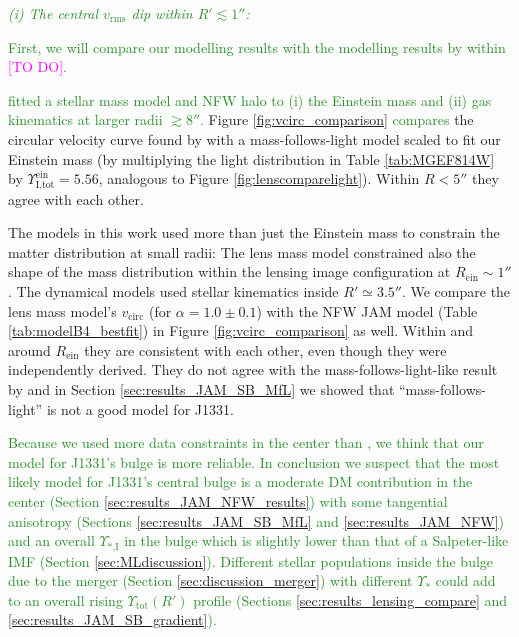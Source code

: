 \documentclass[useAMS,usenatbib]{mnras}
\newcommand{\Wilma}[1]{\textcolor{Magenta}{#1}}
\newcommand{\NEW}[1]{\textcolor{ForestGreen}{#1}}
\newcommand{\OLD}[1]{}
\begin{document}
\NEW{\emph{(i) The central $v_\text{rms}$ dip within $R'\lesssim1''$:}}

\NEW{First, we will compare our modelling results with the modelling results by \citet{SWELLSV} within \Wilma{[TO DO]}.}

\NEW{\citet{SWELLSV} fitted a stellar mass model and NFW halo to (i) the Einstein mass and (ii) gas kinematics at larger radii $\gtrsim8''$. } \OLD{In }Figure \ref{fig:vcirc_comparison} \OLD{we compare}\NEW{compares} the circular velocity curve found by \citet{SWELLSV} with a mass-follows-light model scaled to fit our Einstein mass (by multiplying the light distribution in Table \ref{tab:MGEF814W} by $\Upsilon_\text{I,tot}^\text{ein} = 5.56$, analogous to Figure \ref{fig:lenscomparelight}). Within $R < 5''$ they agree with each other. 

The models in this work used more than just the Einstein mass to constrain the matter distribution at small radii: The lens mass model constrained also the shape of the mass distribution within the lensing image configuration at $R_\text{ein} \sim 1''$. The dynamical models used stellar kinematics inside $R' \simeq 3.5''$. We compare the lens mass model's $v_\text{circ}$ (for $\alpha=1.0\pm 0.1$) with the NFW JAM model (Table \ref{tab:modelB4_bestfit}) in Figure \ref{fig:vcirc_comparison} as well. Within and around $R_\text{ein}$ they are consistent with each other, even though they were independently derived. They do not agree with the mass-follows-light-like result by \citet{SWELLSV} and in Section \ref{sec:results_JAM_SB_MfL} we showed that ``mass-follows-light'' is not a good model for J1331.

\NEW{Because we used more data constraints in the center than \citet{SWELLSV}, we think that our model for J1331's bulge is more reliable. In conclusion we suspect that the most likely model for J1331's central bulge is a moderate DM contribution in the center (Section \ref{sec:results_JAM_NFW_results}) with some tangential anisotropy (Sections \ref{sec:results_JAM_SB_MfL} and \ref{sec:results_JAM_NFW}) and an overall $\Upsilon_\text{*,I}$ in the bulge which is slightly lower than that of a Salpeter-like IMF (Section \ref{sec:MLdiscussion}). Different stellar populations inside the bulge due to the merger (Section \ref{sec:discussion_merger}) with different $\Upsilon_{*}$ could add to an overall rising $\Upsilon_\text{tot}(R')$ profile (Sections \ref{sec:results_lensing_compare} and \ref{sec:results_JAM_SB_gradient}).}

\OLD{Overall, we were not able to find a consistent explanation for J1331's central $v_\text{rms}$ dip. It cannot be due to tangential velocity anisotropy in the center alone (see Section \ref{sec:results_JAM_SB_MfL}, Figure \ref{fig:JAM_modelA2}). It also cannot be explained by a strong contribution of DM inside the bulge together with a moderate tagential velocity anisotropy, because the corresponding \NEW{NFW} DM halo\OLD{s} would still be too massive to fit the data in the outer regions (see Section \ref{sec:results_JAM_NFW}, Figure \ref{fig:modelB4_vrms}).}
\end{document}
